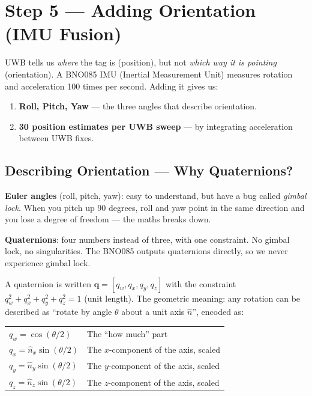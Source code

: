 \documentclass[11pt,a4paper]{article}
\newcommand{\vect}[1]{\bm{#1}}
\begin{document}
\section{Step 5 --- Adding Orientation (IMU Fusion)}
\label{sec:imu}

\begin{plain}
UWB tells us \emph{where} the tag is (position), but not \emph{which way it is pointing} (orientation). A BNO085 IMU (Inertial Measurement Unit) measures rotation and acceleration 100 times per second. Adding it gives us:
\begin{enumerate}[leftmargin=2em,topsep=2pt]
  \item \textbf{Roll, Pitch, Yaw} --- the three angles that describe orientation.
  \item \textbf{30 position estimates per UWB sweep} --- by integrating acceleration between UWB fixes.
\end{enumerate}
\end{plain}

\subsection{Describing Orientation --- Why Quaternions?}

\begin{analogy}
\textbf{Euler angles} (roll, pitch, yaw): easy to understand, but have a bug called \emph{gimbal lock}. When you pitch up 90 degrees, roll and yaw point in the same direction and you lose a degree of freedom --- the maths breaks down.

\textbf{Quaternions}: four numbers instead of three, with one constraint. No gimbal lock, no singularities. The BNO085 outputs quaternions directly, so we never experience gimbal lock.
\end{analogy}

A quaternion is written $\vect{q} = [q_w, q_x, q_y, q_z]$ with the constraint $q_w^2+q_x^2+q_y^2+q_z^2 = 1$ (unit length). The geometric meaning: any rotation can be described as ``rotate by angle $\theta$ about a unit axis $\hat{n}$'', encoded as:

\begin{center}
\begin{tabular}{ll}
$q_w = \cos(\theta/2)$ & The ``how much'' part \\
$q_x = \hat{n}_x \sin(\theta/2)$ & The $x$-component of the axis, scaled \\
$q_y = \hat{n}_y \sin(\theta/2)$ & The $y$-component of the axis, scaled \\
$q_z = \hat{n}_z \sin(\theta/2)$ & The $z$-component of the axis, scaled \\
\end{tabular}
\end{center}
\end{document}
